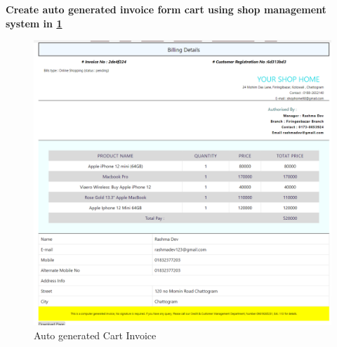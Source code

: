\newpage
\textbf{Create auto generated invoice form cart using shop management system in \ref{fig:fig 6.2.13}}\\[2cm]
\begin{figure}[ht]
    \centering  
    \includegraphics[width=\textwidth, height=0.8\textheight, keepaspectratio]{designs/cart_invoice.png}    
    \caption{Auto generated Cart Invoice}
    \label{fig:fig 6.2.13}
\end{figure}

